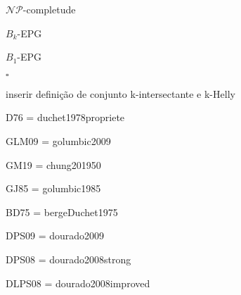 $\mathcal{NP}$-completude

$B_k$-EPG

$B_1$-EPG

 $\square$
 
inserir definição de conjunto k-intersectante e k-Helly



D76 = duchet1978propriete

GLM09 = golumbic2009

GM19 = chung201950

GJ85 = golumbic1985

BD75 = bergeDuchet1975

DPS09 = dourado2009

DPS08 = dourado2008strong

DLPS08 = dourado2008improved